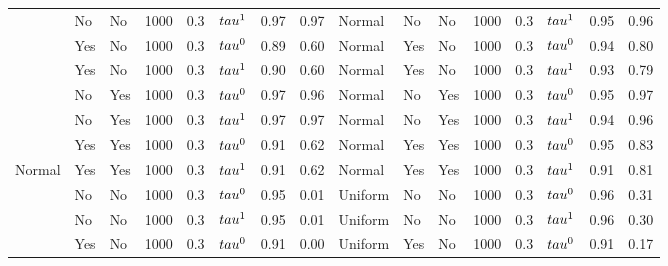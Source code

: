 \begin{tabular}[t]{lllrrlrrlllrrlrr}
 & No & No & 1000 & 0.3 & $\\tau^1$ & 0.97 & 0.97 & Normal & No & No & 1000 & 0.3 & $\\tau^1$ & 0.95 & 0.96\\

 & Yes & No & 1000 & 0.3 & $\\tau^0$ & 0.89 & 0.60 & Normal & Yes & No & 1000 & 0.3 & $\\tau^0$ & 0.94 & 0.80\\

 & Yes & No & 1000 & 0.3 & $\\tau^1$ & 0.90 & 0.60 & Normal & Yes & No & 1000 & 0.3 & $\\tau^1$ & 0.93 & 0.79\\

 & No & Yes & 1000 & 0.3 & $\\tau^0$ & 0.97 & 0.96 & Normal & No & Yes & 1000 & 0.3 & $\\tau^0$ & 0.95 & 0.97\\

 & No & Yes & 1000 & 0.3 & $\\tau^1$ & 0.97 & 0.97 & Normal & No & Yes & 1000 & 0.3 & $\\tau^1$ & 0.94 & 0.96\\

 & Yes & Yes & 1000 & 0.3 & $\\tau^0$ & 0.91 & 0.62 & Normal & Yes & Yes & 1000 & 0.3 & $\\tau^0$ & 0.95 & 0.83\\

\multirow{-8}{*}{\raggedright\arraybackslash Normal} & Yes & Yes & 1000 & 0.3 & $\\tau^1$ & 0.91 & 0.62 & Normal & Yes & Yes & 1000 & 0.3 & $\\tau^1$ & 0.91 & 0.81\\
\cmidrule{1-16}
 & No & No & 1000 & 0.3 & $\\tau^0$ & 0.95 & 0.01 & Uniform & No & No & 1000 & 0.3 & $\\tau^0$ & 0.96 & 0.31\\

 & No & No & 1000 & 0.3 & $\\tau^1$ & 0.95 & 0.01 & Uniform & No & No & 1000 & 0.3 & $\\tau^1$ & 0.96 & 0.30\\

 & Yes & No & 1000 & 0.3 & $\\tau^0$ & 0.91 & 0.00 & Uniform & Yes & No & 1000 & 0.3 & $\\tau^0$ & 0.91 & 0.17\\


\end{tabular}
